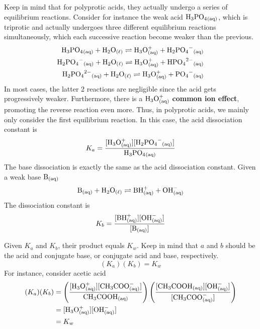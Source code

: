 Keep in mind that for polyprotic acids, they actually undergo a series of equilibrium reactions.
Consider for instance the weak acid $\ch{H3PO4_{(aq)}}$, which is triprotic and actually undergoes 
three different equilibrium reactions simultaneously, which each successive reaction become
weaker than the previous.
\begin{align*}
    \ch{H3PO4_{(aq)}}+\ch{H2O_{(\ell)}}\rightleftharpoons \ch{H3O^+_{(aq)}}+\ch{H2PO4^-_{(aq)}}\\
    \ch{H2PO4^-_{(aq)}}+\ch{H2O_{(\ell)}}\rightleftharpoons \ch{H3O^+_{(aq)}}+\ch{HPO4^{2-}_{(aq)}}\\
    \ch{H2PO4^{2-}_{(aq)}}+\ch{H2O_{(\ell)}}\rightleftharpoons \ch{H3O^+_{(aq)}}+\ch{PO4^-_{(aq)}}\\
\end{align*}
In most cases, the latter 2 reactions are negligible since the acid gets progressively weaker. 
Furthermore, there is a $\ch{H3O^+_{(aq)}}$ \textbf{common ion effect}, promoting the reverse 
reaction even more. Thus, in polyprotic acids, we mainly only consider the first equilibrium reaction.
In this case, the acid dissociation constant is
\[
    K_a=\frac{[\ch{H3O^+_{(aq)}}][\ch{H2PO4^-_{(aq)}}]}{\ch{H3PO4_{(aq)}}}
\]
The base dissociation is exactly the same as the acid dissociation constant. Given a weak base
$\ch{B_{(aq)}}$
\[
    \ch{B_{(aq)}}+\ch{H2O_{(\ell)}}\rightleftharpoons \ch{BH^+_{(aq)}}+\ch{OH^-_{(aq)}}
\]
The dissociation constant is
\[
    K_b=\frac{[\ch{BH^+_{(aq)}}][\ch{OH^-_{(aq)}}]}{[\ch{B_{(aq)}}]}
\]
\begin{important}
    Given $K_a$ and $K_b$, their product equals $K_w$. Keep in mind that $a$ and $b$ should be
    the acid and conjugate base, or conjugate acid and base, respectively.
    \[
        (K_a)(K_b)=K_w
    \]
    For instance, consider acetic acid
    \begin{align*}
        (K_a)(K_b)&=\left(\frac{[\ch{H3O^+_{(aq)}}][\ch{CH3COO^-_{(aq)}}]}{\ch{CH3COOH_{(aq)}}}\right)\left(\frac{[\ch{CH3COOH_{(aq)}}][\ch{OH^-_{(aq)}}]}{[\ch{CH3COO^-_{(aq)}}]}\right)\\
                  &=[\ch{H3O^+_{(aq)}}][\ch{OH^-_{(aq)}}]\\
                  &=K_w
    \end{align*}
\end{important}
